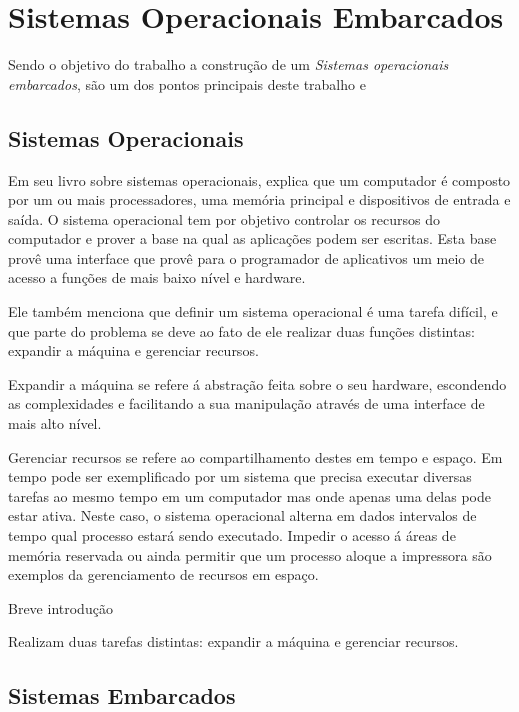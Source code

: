 \chapter{Sistemas Operacionais Embarcados}

Sendo o objetivo do trabalho a construção de um \emph{Sistemas operacionais embarcados},  são um dos pontos principais deste trabalho e 

\section{Sistemas Operacionais}

Em seu livro sobre sistemas operacionais,  explica que um computador é composto por um ou mais processadores, uma memória principal e dispositivos de entrada e saída. O sistema operacional tem por objetivo controlar os recursos do computador e prover a base na qual as aplicações podem ser escritas. Esta base provê uma interface que provê para o programador de aplicativos um meio de acesso a funções de mais baixo nível e hardware.

Ele também menciona que definir um sistema operacional é uma tarefa difícil, e que parte do problema se deve ao fato de ele realizar duas funções distintas: expandir a máquina e gerenciar recursos.

Expandir a máquina se refere á abstração feita sobre o seu hardware, escondendo as complexidades e facilitando a sua manipulação através de uma interface de mais alto nível. 

Gerenciar recursos se refere ao compartilhamento destes em tempo e espaço. Em tempo pode ser exemplificado por um sistema que precisa executar diversas tarefas ao mesmo tempo em um computador mas onde apenas uma delas pode estar ativa. Neste caso, o sistema operacional alterna em dados intervalos de tempo qual processo estará sendo executado. Impedir o acesso á áreas de memória reservada ou ainda permitir que um processo aloque a impressora são exemplos da gerenciamento de recursos em espaço.




Breve introdução

Realizam duas tarefas distintas: expandir a máquina e gerenciar recursos.

\section{Sistemas Embarcados}

